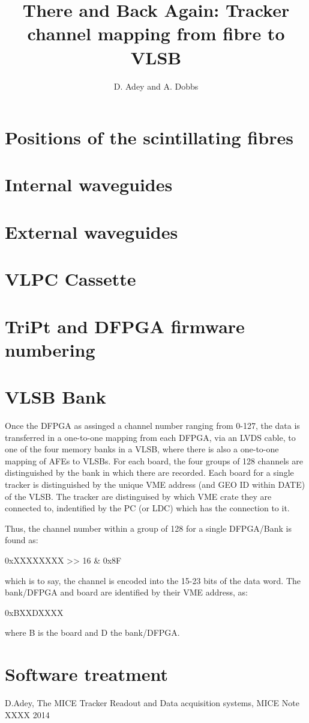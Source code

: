 \documentclass[a4paper]{article}
\begin{document}
\title{ There and Back Again: Tracker channel mapping from fibre to VLSB}
\author{D. Adey and A. Dobbs}
\maketitle

\section*{Positions of the scintillating fibres}
\section*{Internal waveguides}
\section*{External waveguides}
\section*{VLPC Cassette}
\section*{TriPt and DFPGA firmware numbering}
\section*{VLSB Bank}


Once the DFPGA as assinged a channel number ranging from 0-127, the data is transferred in a one-to-one mapping from each DFPGA, via an LVDS cable, to one of the four memory banks in a VLSB, where there is also a one-to-one mapping of AFEs to VLSBs. For each board, the four groups of 128 channels are distinguished by the bank in which there are recorded. Each board for a single tracker is distinguished by the unique VME address (and GEO ID within DATE) of the VLSB. The tracker are distinguised by which VME crate they are connected to, indentified by the PC (or LDC) which has the connection to it.

Thus, the channel number within a group of 128 for a single DFPGA/Bank is found as:

0xXXXXXXXX >> 16 \& 0x8F

which is to say, the channel is encoded into the 15-23 bits of the data word. The bank/DFPGA and board are identified by their VME address, as:

0xBXXDXXXX

where B is the board and D the bank/DFPGA.
\section*{Software treatment}
\begin{thebibliography}{9}
 D.Adey, The MICE Tracker Readout and Data acquisition systems, MICE Note XXXX 2014
\end{thebibliography}
\end{document}
